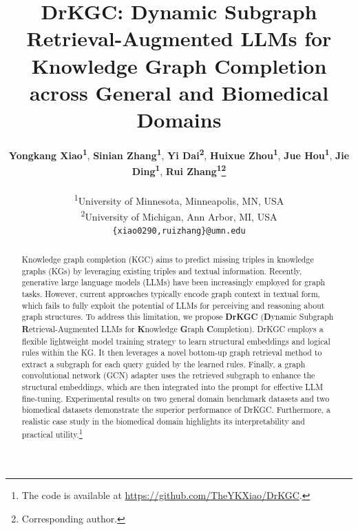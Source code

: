 \documentclass[11pt]{article}
\title{DrKGC: Dynamic Subgraph Retrieval-Augmented LLMs for Knowledge Graph Completion across General and Biomedical Domains}
\author{
 \textbf{Yongkang Xiao\textsuperscript{1}},
 \textbf{Sinian Zhang\textsuperscript{1}},
 \textbf{Yi Dai\textsuperscript{2}},
 \textbf{Huixue Zhou\textsuperscript{1}},
 \textbf{Jue Hou\textsuperscript{1}},
 \textbf{Jie Ding\textsuperscript{1}},
 \textbf{Rui Zhang\textsuperscript{1}\thanks{Corresponding author.}}
\\
\\
 \textsuperscript{1}University of Minnesota, Minneapolis, MN, USA \\
 \textsuperscript{2}University of Michigan, Ann Arbor, MI, USA 
\\
\texttt{\{xiao0290,ruizhang\}@umn.edu}
}
\begin{document}
\maketitle


\begin{abstract}

Knowledge graph completion (KGC) aims to predict missing triples in knowledge graphs (KGs) by leveraging existing triples and textual information. Recently, generative large language models (LLMs) have been increasingly employed for graph tasks. However, current approaches typically encode graph context in textual form, which fails to fully exploit the potential of LLMs for perceiving and reasoning about graph structures. To address this limitation, we propose \textbf{DrKGC} (\textbf{D}ynamic Subgraph \textbf{R}etrieval-Augmented LLMs for \textbf{K}nowledge \textbf{G}raph \textbf{C}ompletion). DrKGC employs a flexible lightweight model training strategy to learn structural embeddings and logical rules within the KG. It then leverages a novel bottom-up graph retrieval method to extract a subgraph for each query guided by the learned rules. Finally, a graph convolutional network (GCN) adapter uses the retrieved subgraph to enhance the structural embeddings, which are then integrated into the prompt for effective LLM fine-tuning. Experimental results on two general domain benchmark datasets and two biomedical datasets demonstrate the superior performance of DrKGC. Furthermore, a realistic case study in the biomedical domain highlights its interpretability and practical utility.\footnote{The code is available at \url{https://github.com/TheYKXiao/DrKGC}.}



\end{abstract}
\end{document}
